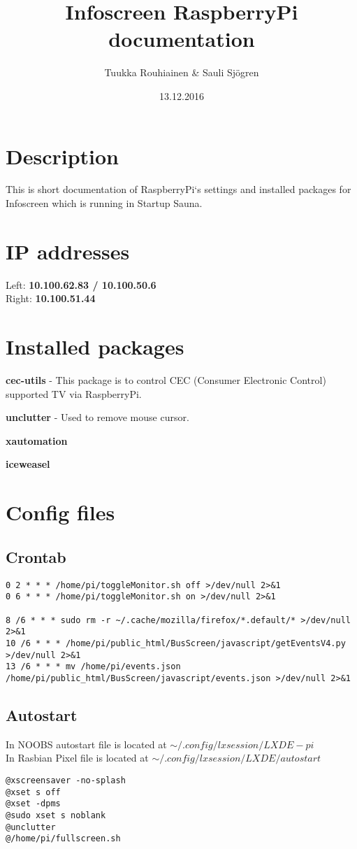 \documentclass{article}
\title{Infoscreen RaspberryPi documentation}
\author{Tuukka Rouhiainen \& Sauli Sjögren}
\begin{document}
\date{13.12.2016}
\maketitle
\thispagestyle{fancy}

\section{Description}
This is short documentation of RaspberryPi`s settings and installed packages for Infoscreen which is running in Startup Sauna.
\section{IP addresses}
Left: \textbf{10.100.62.83 / 10.100.50.6} \\
Right: \textbf{10.100.51.44}
\section{Installed packages}
\textbf{cec-utils} - This package is to control CEC (Consumer Electronic Control) supported TV via RaspberryPi.

\textbf{unclutter} - Used to remove mouse cursor.

\textbf{xautomation}

\textbf{iceweasel}
\section{Config files}
\subsection{Crontab}
\begin{verbatim}
0 2 * * * /home/pi/toggleMonitor.sh off >/dev/null 2>&1
0 6 * * * /home/pi/toggleMonitor.sh on >/dev/null 2>&1

8 /6 * * * sudo rm -r ~/.cache/mozilla/firefox/*.default/* >/dev/null 2>&1
10 /6 * * * /home/pi/public_html/BusScreen/javascript/getEventsV4.py >/dev/null 2>&1
13 /6 * * * mv /home/pi/events.json /home/pi/public_html/BusScreen/javascript/events.json >/dev/null 2>&1
\end{verbatim}
\subsection{Autostart}
In NOOBS autostart file is located at $\sim/.config/lxsession/LXDE-pi$ \\
In Rasbian Pixel file is located at $\sim/.config/lxsession/LXDE/autostart$
\begin{verbatim}
@xscreensaver -no-splash
@xset s off
@xset -dpms
@sudo xset s noblank
@unclutter
@/home/pi/fullscreen.sh
\end{verbatim}
\end{document}

